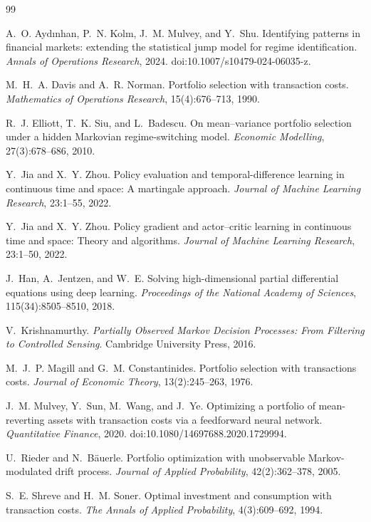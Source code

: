 \documentclass[a4paper,10pt]{article}
\begin{document}
\begin{thebibliography}{99}

A.~O. Ayd{\i}nhan, P.~N. Kolm, J.~M. Mulvey, and Y.~Shu.
Identifying patterns in financial markets: extending the statistical jump model for regime identification.
\emph{Annals of Operations Research}, 2024.
doi:10.1007/s10479-024-06035-z.

M.~H.~A. Davis and A.~R. Norman.
Portfolio selection with transaction costs.
\emph{Mathematics of Operations Research}, 15(4):676--713, 1990.

R.~J. Elliott, T.~K. Siu, and L.~Badescu.
On mean--variance portfolio selection under a hidden Markovian regime-switching model.
\emph{Economic Modelling}, 27(3):678--686, 2010.

Y.~Jia and X.~Y. Zhou.
Policy evaluation and temporal-difference learning in continuous time and space: A martingale approach.
\emph{Journal of Machine Learning Research}, 23:1--55, 2022.

Y.~Jia and X.~Y. Zhou.
Policy gradient and actor--critic learning in continuous time and space: Theory and algorithms.
\emph{Journal of Machine Learning Research}, 23:1--50, 2022.

J.~Han, A.~Jentzen, and W.~E.
Solving high-dimensional partial differential equations using deep learning.
\emph{Proceedings of the National Academy of Sciences}, 115(34):8505--8510, 2018.

V.~Krishnamurthy.
\emph{Partially Observed Markov Decision Processes: From Filtering to Controlled Sensing}.
Cambridge University Press, 2016.

M.~J.~P. Magill and G.~M. Constantinides.
Portfolio selection with transactions costs.
\emph{Journal of Economic Theory}, 13(2):245--263, 1976.

J.~M. Mulvey, Y.~Sun, M.~Wang, and J.~Ye.
Optimizing a portfolio of mean-reverting assets with transaction costs via a feedforward neural network.
\emph{Quantitative Finance}, 2020. doi:10.1080/14697688.2020.1729994.

U.~Rieder and N.~B{\"a}uerle.
Portfolio optimization with unobservable Markov-modulated drift process.
\emph{Journal of Applied Probability}, 42(2):362--378, 2005.

S.~E. Shreve and H.~M. Soner.
Optimal investment and consumption with transaction costs.
\emph{The Annals of Applied Probability}, 4(3):609--692, 1994.


\end{thebibliography}
\end{document}
